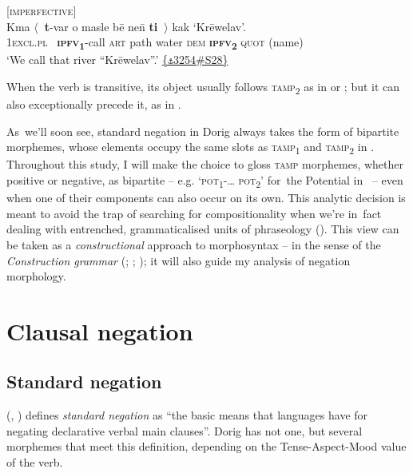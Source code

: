 \documentclass[output=paper,colorlinks,citecolor=brown,draft]{langscibook}
\begin{document}
\ea\label{ex:dor:river} [\textsc{imperfective}] \\
    \gll  Kma \textrm{${\langle}$}\textbf{~t}-var o masle bē ne\={n} \textbf{ti~}\textrm{${\rangle}$} kak ‘Krēwelav’. \\
        \textsc{1excl.pl} ~\textbf{\textsc{ipfv}\textsubscript{1}}-call \textsc{art} path water \textsc{dem} \textbf{\textsc{ipfv}\textsubscript{2}} \textsc{quot} (name)\\
    \glt ‘We call that river “Krēwelav”.’ \quad  \href{https://doi.org/10.24397/pangloss-0003254#S28}{\{\texttt{⚓}3254\#S28\}}
\z 

\noindent When the verb is transitive, its object usually follows \textsc{tamp}\textsubscript{2} as in  or ; but it can also exceptionally precede it, as in . 

As~we’ll soon see, standard negation in Dorig always takes the form of bipartite morphemes, whose elements occupy the same slots as \textsc{tamp}\textsubscript{1} and \textsc{tamp}\textsubscript{2} in .
Throughout this study, I will make the choice to gloss \textsc{tamp} morphemes, whether positive or negative, as bipartite – e.g. ‘\textsc{pot}\textsubscript{1}-… \textsc{pot\textsubscript{2}}’ for~the Potential in~ – even when one of their components can also occur on its own. This analytic decision is meant to avoid the trap of searching for compositionality when we’re in~fact dealing with entrenched, grammaticalised units of phraseology (\citealt[31]{François2003}). This view can be taken as a \textit{constructional} approach to morphosyntax – in the sense of the \textit{Construction grammar} (\citealt{FillmoreEtAl1988}; \citealt{Croft2001}; \citealt{BarðdalEtAl2015}); it will also guide my analysis of negation morphology.

\section{Clausal negation}\label{sec:dor:2}
\subsection{Standard negation}\label{sec:dor:2.1}
\label{bkm:Ref36662877}\label{bkm:Ref130726661}
\citeauthor{Miestamo2005} (\citeyear[39]{Miestamo2005}, \citeyear[553]{Miestamo2007}) defines \textit{standard negation} as “the basic means that languages have for negating declarative verbal main clauses”. Dorig has not one, but several morphemes that meet this definition, depending on the Tense-Aspect-Mood value of the verb.
\end{document}
